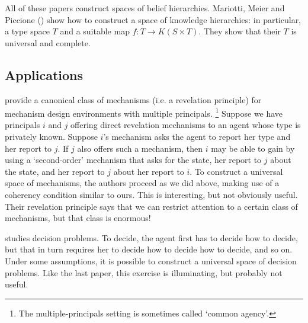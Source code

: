 \documentclass[11pt,letterpaper,reqno,oneside]{article}
\begin{document}
All of these papers construct spaces of belief hierarchies. Mariotti, Meier and Piccione (\citeyear{MariottiMeierPiccione2005}) show how to construct a space of knowledge hierarchies: in particular, a type space $T$ and a suitable map $f : T \to K( S \times T )$. They show that their $T$ is universal and complete.



\subsection{Applications}
\label{sec:belief_hierarchies:applications}

\textcite{EpsteinPeters1999} provide a canonical class of mechanisms (i.e. a revelation principle) for mechanism design environments with multiple principals.%
	\footnote{The multiple-principals setting is sometimes called `common agency'.}
Suppose we have principals $i$ and $j$ offering direct revelation mechanisms to an agent whose type is privately known. Suppose $i$'s mechanism asks the agent to report her type and her report to $j$. If $j$ also offers such a mechanism, then $i$ may be able to gain by using a `second-order' mechanism that asks for the state, her report to $j$ about the state, and her report to $j$ about her report to $i$. To construct a universal space of mechanisms, the authors proceed as we did above, making use of a coherency condition similar to ours. This is interesting, but not obviously useful. Their revelation principle says that we can restrict attention to a certain class of mechanisms, but that class is enormous!

\textcite{Lipman1991} studies decision problems. To decide, the agent first has to decide how to decide, but that in turn requires her to decide how to decide how to decide, and so on. Under some assumptions, it is possible to construct a universal space of decision problems. Like the last paper, this exercise is illuminating, but probably not useful.
\end{document}
